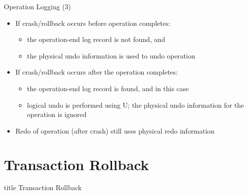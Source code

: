 \documentclass[aspectratio=169, xcolor=dvipsnames]{beamer}
\begin{document}
\begin{frame}{Operation Logging (3)}
    \begin{itemize}[<+->]
        \item If crash/rollback occurs before operation completes:
        \begin{itemize}
            \item[$\triangleright$] the operation-end log record is not found, and
            \item[$\triangleright$] the physical undo information is used to undo operation
        \end{itemize}
        \item If crash/rollback occurs after the operation completes:
        \begin{itemize}
            \item[$\triangleright$] the operation-end log record is found, and in this case
            \item[$\triangleright$] logical undo is performed using U; the physical undo information for the operation is ignored
        \end{itemize}
        \item Redo of operation (after crash) still uses physical redo information
    \end{itemize}
\end{frame}

\section{Transaction Rollback}

\begin{frame}
  \vfill
  \centering
  \begin{beamercolorbox}[sep=8pt,center,shadow=true,rounded=true]{title}
    Transaction Rollback\par%
  \end{beamercolorbox}
  \vfill
\end{frame}
\end{document}
